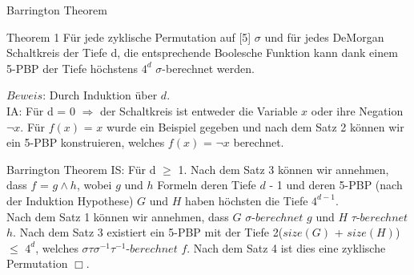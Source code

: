 \documentclass{beamer}
\begin{document}
\begin{frame}{Barrington Theorem}
\begin{block}{Theorem 1}
Für jede zyklische Permutation auf [5] $\sigma$ und für jedes DeMorgan Schaltkreis der Tiefe d, die entsprechende Boolesche Funktion kann dank einem 5-PBP der Tiefe höchstens $4^d$ $\sigma$-berechnet werden.
\end{block}
$Beweis$: Durch Induktion über $d$.\\
IA: Für d = 0 $\Rightarrow$ der Schaltkreis ist entweder die Variable $x$ oder ihre Negation $\lnot x$. Für $f(x)$ = $x$ wurde ein Beispiel gegeben und nach dem Satz 2 können wir ein 5-PBP konstruieren, welches $f(x)$ = $\lnot x$ berechnet.\\


\end{frame}
\begin{frame}{Barrington Theorem}
IS: Für d $\ge$ 1. Nach dem Satz 3 können wir annehmen, dass $f$ = $g\wedge h$, wobei $g$ und $h$ Formeln deren Tiefe $d$ - 1 und deren 5-PBP (nach der Induktion Hypothese) $G$ und $H$ haben höchsten die Tiefe $4^{d-1}$. \\
Nach dem Satz 1 können wir annehmen, dass $G$ $\sigma$-$berechnet$ $g$ und $H$ $\tau$-$berechnet$ $h$. Nach dem Satz 3 existiert ein 5-PBP mit der Tiefe 2($size(G)$ + $size(H)$) $\le$ $4^{d}$, welches 
$\sigma\tau\sigma^{-1}\tau^{-1}$-$berechnet$ $f$. Nach dem Satz 4 ist dies eine zyklische Permutation $\Box$. 
\end{frame}
\end{document}
